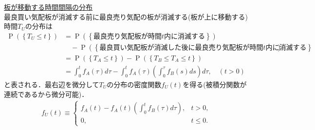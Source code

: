 \documentclass[a4j,papersize,disablejfam,slide,14pt]{jsarticle}
\def\prob#1{\operatorname{P} \left(\left\{ #1 \right\}\right)} %
\begin{document}
\underline{\large 板が移動する時間間隔の分布}\\
    最良買い気配板が消滅する前に最良売り気配の板が消滅する(板が上に移動する)時間$T_U$の分布は
    \begin{align}
    	\prob{T_U \leq t} &= \prob{\mbox{最良売り気配板が時間$t$内に消滅する}} \\
        &\quad- \prob{\mbox{最良買い気配板が消滅した後に最良売り気配板が時間$t$内に消滅する}} \\
        &= \prob{T_A \leq t} - \prob{T_B \leq T_A \leq t} \\
        &= \int_{0}^{t} f_A(\tau)d\tau - \int_{0}^{t} f_A(\tau) \left( \int_{0}^{\tau} f_B(s)ds \right) d\tau, \quad (t>0)
    \end{align}
    と表される．最右辺を微分して$T_U$の分布の密度関数$f_U(t)$を得る(被積分関数が連続であるから微分可能)．
    \begin{align}
    	f_U(t) \equiv \begin{cases}
        	f_A(t) - f_A(t) \left( \int_{0}^{t} f_B(\tau)d\tau \right), & t>0, \\
            0, & t \leq 0.
    	\end{cases}
    \end{align}
    
\end{document}

